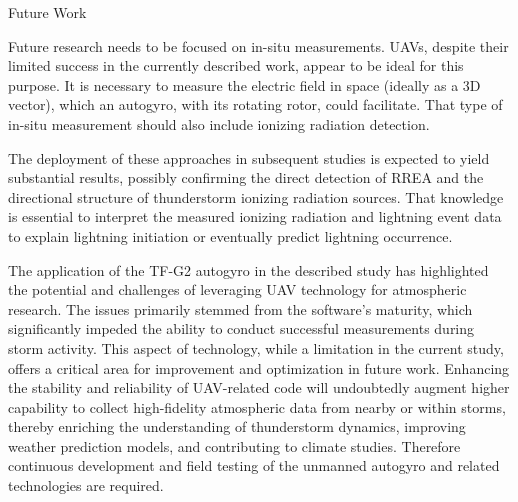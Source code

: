 \sec Future Work

Future research needs to be  focused on in-situ measurements. UAVs, despite their limited success in the currently described work, appear to be ideal for this purpose. It is necessary to measure the electric field in space (ideally as a 3D vector), which an autogyro, with its rotating rotor, could facilitate. That type of in-situ measurement should also include ionizing radiation detection.

The deployment of these approaches in subsequent studies is expected to yield substantial results, possibly confirming the direct detection of RREA and the directional structure of thunderstorm ionizing  radiation sources. That knowledge is essential to interpret the measured ionizing radiation and lightning event data to explain lightning initiation or eventually predict lightning occurrence. 

The application of the TF-G2 autogyro in the described study has highlighted the potential and challenges of leveraging UAV technology for atmospheric research. The issues primarily stemmed from the software's maturity, which significantly impeded the ability to conduct successful measurements during storm activity. This aspect of technology, while a limitation in the current study, offers a critical area for improvement and optimization in future work. Enhancing the stability and reliability of UAV-related code will undoubtedly augment higher capability to collect high-fidelity atmospheric data from nearby or within storms, thereby enriching the understanding of thunderstorm dynamics, improving weather prediction models, and contributing to climate studies. Therefore continuous development and field testing of the unmanned autogyro and related technologies are required.



